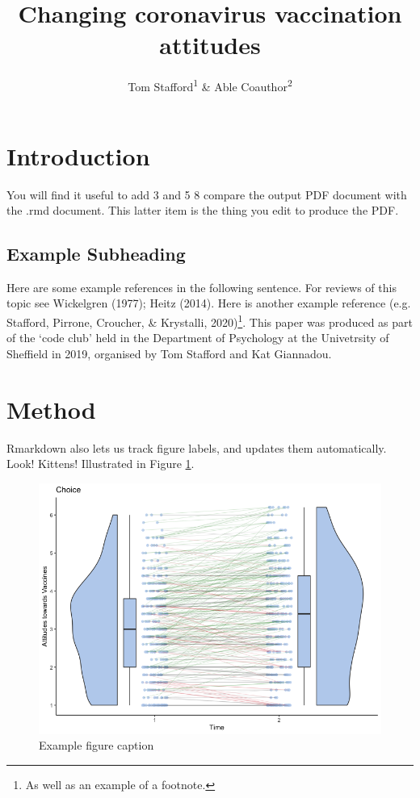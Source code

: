 \documentclass[
  english,
  ,jou,floatsintext]{apa6}
\title{Changing coronavirus vaccination attitudes}
\author{Tom Stafford\textsuperscript{1} \& Able Coauthor\textsuperscript{2}}
\date{}
\affiliation{\vspace{0.5cm}\textsuperscript{1} University of Sheffield\\\textsuperscript{2} University of Bergen}
\begin{document}
\maketitle

\hypertarget{introduction}{%
\section{Introduction}\label{introduction}}

You will find it useful to add 3 and 5 8 compare the output PDF document with the .rmd document. This latter item is the thing you edit to produce the PDF.

\hypertarget{example-subheading}{%
\subsection{Example Subheading}\label{example-subheading}}

Here are some example references in the following sentence. For reviews of this topic see Wickelgren (1977); Heitz (2014). Here is another example reference (e.g. Stafford, Pirrone, Croucher, \& Krystalli, 2020)\footnote{As well as an example of a footnote.}. This paper was produced as part of the `code club' held in the Department of Psychology at the Univetrsity of Sheffield in 2019, organised by Tom Stafford and Kat Giannadou.

\hypertarget{method}{%
\section{Method}\label{method}}

Rmarkdown also lets us track figure labels, and updates them automatically. Look! Kittens! Illustrated in Figure \ref{fig:examplefigurename}.

\begin{figure}

{\centering \includegraphics[width=0.75\linewidth]{../plots/ChoiceViolin} 

}

\caption{Example figure caption}\label{fig:examplefigurename}
\end{figure}
\end{document}
